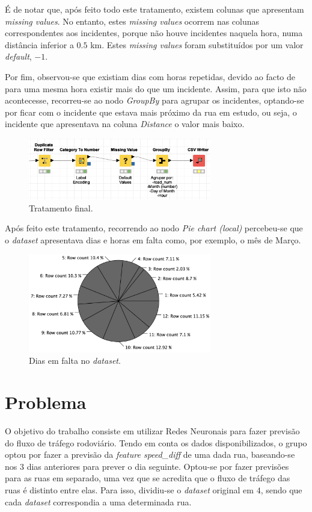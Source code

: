 \documentclass[a4paper, 12pt]{article}
\begin{document}
É de notar que, após feito todo este tratamento, existem colunas que apresentam \textit{missing values}. No entanto, estes \textit{missing values} ocorrem nas colunas correspondentes aos incidentes, porque não houve incidentes naquela hora, numa distância inferior a $0.5$ km. Estes \textit{missing values} foram substituídos por um valor \textit{default}, $-1$.

Por fim, observou-se que existiam dias com horas repetidas, devido ao facto de para uma mesma hora existir mais do que um incidente. Assim, para que isto não acontecesse, recorreu-se ao nodo \textit{GroupBy} para agrupar os incidentes, optando-se por ficar com o incidente que estava mais próximo da rua em estudo, ou seja, o incidente que apresentava na coluna \textit{Distance} o valor mais baixo.

\begin{figure}[H]
	\centering
	\includegraphics[width=8cm]{fim}
	\caption{Tratamento final.}
\end{figure}

Após feito este tratamento, recorrendo ao nodo \textit{Pie chart (local)} percebeu-se que o \textit{dataset} apresentava dias e horas em falta como, por exemplo, o mês de Março.

\begin{figure}[H]
	\centering
	\includegraphics[width=8cm]{mes_dias}
	\caption{Dias em falta no \textit{dataset}.}
\end{figure}

\section{Problema}

O objetivo do trabalho consiste em utilizar Redes Neuronais para fazer previsão do fluxo de tráfego rodoviário. Tendo em conta os dados disponibilizados, o grupo optou por fazer a previsão da \textit{feature speed\_diff} de uma dada rua, baseando-se nos $3$ dias anteriores para prever o dia seguinte. Optou-se por fazer previsões para as ruas em separado, uma vez que se acredita que o fluxo de tráfego das ruas é distinto entre elas. Para isso, dividiu-se o \textit{dataset} original em $4$, sendo que cada \textit{dataset} correspondia a uma determinada rua.
\end{document}
